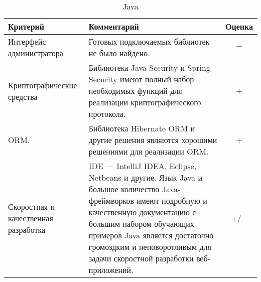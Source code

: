 \bgroup %
\def\arraystretch{1.5}%
  \begin{longtable}{| p{} | p{} | c |} 
  \caption{Java} %
  \hline
    Критерий & Комментарий & Оценка \\
  \hline
    Интерфейс администратора

    & Готовых подключаемых библиотек не было найдено.

    & $-$ \\
  \hline
    Криптографические средства

    & Библиотека Java Security и Spring Security имеют полный набор необходимых функций для реализации криптографического протокола.

    & + \\
  \hline
    ORM.
    
    & Библиотека Hibernate ORM и другие решения являются хорошими решениями для реализации ORM. 

    & + \\
  \hline
    Скоростная и качественная разработка
    
    & IDE — IntelliJ IDEA, Eclipse, Netbeans и другие. Язык Java и большое количество Java-фреймворков имеют подробную и качественную документацию с большим набором обучающих примеров Java является достаточно громоздким и неповоротливым для задачи скоростной разработки веб-приложений. 

    & +/$-$ \\
  \hline

  \end{longtable}
\egroup %

\pagebreak

